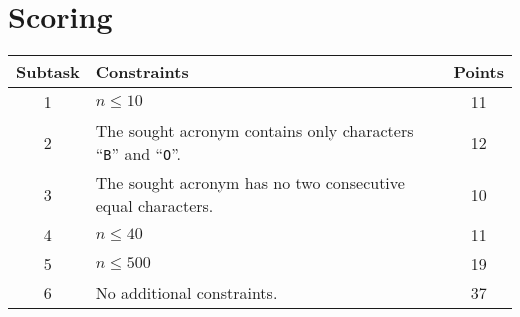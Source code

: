 \section*{Scoring}
\begin{center}
\begin{tabular}{|c|p{13cm}|c|}
\hline
\textbf{Subtask} & \textbf{Constraints} & \textbf{Points} \\ \hline
1 & $n \leq 10$ & 11 \\\hline
2 & The sought acronym contains only characters ``\texttt{B}'' and ``\texttt{O}''. & 12 \\\hline
3 & The sought acronym has no two consecutive equal characters. & 10 \\\hline
4 & $n \leq 40$ & 11 \\\hline
5 & $n \leq 500$ & 19 \\\hline
6 & No additional constraints. & 37 \\\hline
\end{tabular}
\end{center}
